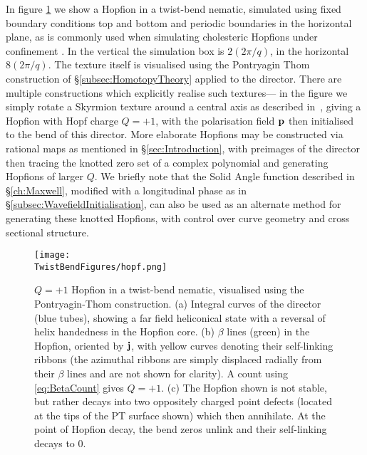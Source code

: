 {In figure \ref{fig:Hopf} we show a Hopfion in a twist-bend nematic, simulated using fixed boundary conditions top and bottom and periodic boundaries in the horizontal plane, as is commonly used when simulating cholesteric Hopfions under confinement \citep{Ackerman2017}. In the vertical the simulation box is $2(2\pi/q)$, in the horizontal $8(2\pi/q)$. The texture itself is visualised using the Pontryagin Thom construction of \S\ref{subsec:HomotopyTheory} applied to the director. There are multiple constructions which explicitly realise such textures--- in the figure we simply rotate a Skyrmion texture around a central axis as described in~\citep{Sutcliffe2007}, giving a Hopfion with Hopf charge $Q=+1$, with the polarisation field $\mathbf{p}$  then initialised to the bend of this director. More elaborate Hopfions may be constructed via rational maps \citep{Sutcliffe2007} as mentioned in \S\ref{sec:Introduction}, with preimages of the director then tracing the knotted zero set of a complex polynomial and generating Hopfions of larger $Q$. We briefly note that the Solid Angle function described in \S\ref{ch:Maxwell}, modified with a longitudinal phase as in \S\ref{subsec:WavefieldInitialisation}, can also be used as an alternate method for generating these knotted Hopfions, with control over curve geometry and cross sectional structure. 
\begin{figure}[htbp]
    \centering
    \texttt{[image: \\TwistBendFigures/hopf.png]}
    \caption[Hopfion in a twist-bend nematic.]{$Q=+1$ Hopfion in a twist-bend nematic, visualised using the Pontryagin-Thom construction. (a) Integral curves of the director (blue tubes), showing a far field heliconical state with a reversal of helix handedness in the Hopfion core. (b) $\beta$ lines (green) in the Hopfion, oriented by $\mathbf{j}$, with yellow curves denoting their self-linking ribbons (the azimuthal ribbons are simply displaced radially from their $\beta$ lines and are not shown for clarity). A count using \eqref{eq:BetaCount} gives $Q=+1$. (c) The Hopfion shown is not stable, but rather decays into two oppositely charged point defects (located at the tips of the PT surface shown) which then annihilate.  At the point of Hopfion decay, the bend zeros unlink and their self-linking decays to $0$.}
    \label{fig:Hopf}
\end{figure}

}
